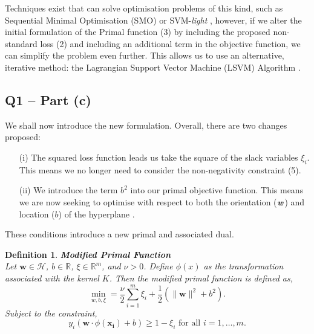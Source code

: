 \documentclass{article}
\newtheorem{definition}{Definition}[section]
\begin{document}
Techniques exist that can solve optimisation problems of this kind, such as Sequential Minimal Optimisation (SMO) \cite{platt1998sequential} or SVM-\textit{light} \cite{joachims1999svmlight}, however, if we alter the initial formulation of the Primal function (3) by including the proposed non-standard loss (2) and including an additional term in the objective function, we can simplify the problem even further. This allows us to use an alternative, iterative method: the Lagrangian Support Vector Machine (LSVM) Algorithm \cite{mangasarian2001lagrangian}. 


\subsection*{\textbf{Q1 – Part (c)}}    
We shall now introduce the new formulation. Overall, there are two changes proposed:
	\begin{enumerate} 
	    \item[(i)]
	    The squared loss function leads us take the square of the slack variables $\xi_{i}$. This means we no longer need to consider the non-negativity constraint (5).
	    \item[(ii)]
	    We introduce the term $b^2$ into our primal objective function. This means we are now seeking to optimise with respect to both the orientation ($\textbf{\textit{w}}$) and location ($b$) of the hyperplane \cite{mangasarian1999successive}.
	\end{enumerate}

These conditions introduce a new primal and associated dual.

\begin{definition} \textbf{Modified Primal Function} \cite{scholkopf2002learning:ch10}\\
Let $\textbf{w} \in \mathcal{H}$, $b \in \mathbb{R}$, $\xi \in \mathbb{R}^m$, and $\nu > 0$. Define $\phi (x)$ as the transformation associated with the kernel $K$. Then the modified primal function is defined as,
\begin{equation}
    \min_{w, b, \xi} = \frac{\nu}{2} \sum_{i=1}^{m} \xi_i + \frac{1}{2} ( \| \textbf{w} \|^2 + b^2).
\end{equation}
Subject to the constraint,
\begin{equation}
    y_i ( \textbf{w} \cdot \phi(\mathbf{x_{i}}) + b) \geq 1  -\xi_{i} \text{ for all } i=1, \dots, m.
\end{equation}
\end{definition}
\end{document}
